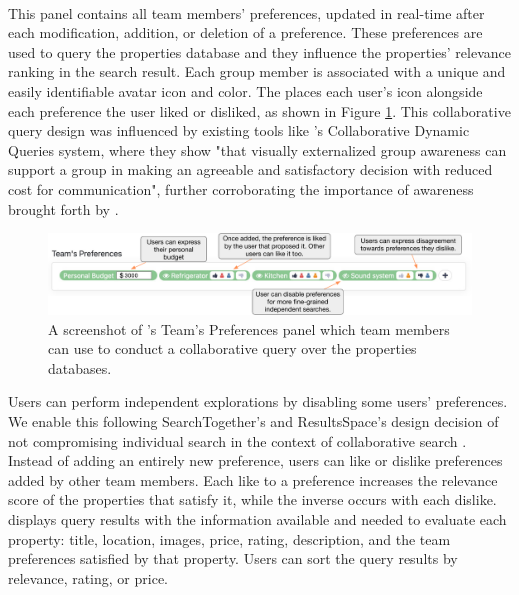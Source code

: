 \paragraph{\collabQueryPanel} This panel contains all team members' preferences, updated in real-time after each modification, addition, or deletion of a preference. These preferences are used to query the properties database and they influence the properties' relevance ranking in the search result. Each group member is associated with a unique and easily identifiable avatar icon and color. The \collabQueryPanel places each user's icon alongside each preference the user liked or disliked, as shown in Figure \ref{fig:ui_teams_preferences}. This collaborative query design was influenced by existing tools like \citeauthor{c-dq}'s Collaborative Dynamic Queries system, where they show "that visually externalized group awareness can support a
group in making an agreeable and satisfactory decision with
reduced cost for communication", further corroborating the importance of awareness brought forth by \citeauthor{searchtogether} \cite{c-dq,searchtogether, cometogether}.
\begin{figure}
    \centering
    \includegraphics[width=1\textwidth]{images/ui-team-preferences.pdf}
    \caption{A screenshot of \tool's Team's Preferences panel which team members can use to conduct a collaborative query over the properties databases.}
    \label{fig:ui_teams_preferences}
\end{figure}

Users can perform independent explorations by disabling some users' preferences. We enable this following SearchTogether's and ResultsSpace's design decision of not compromising individual search in the context of collaborative search \cite{searchtogether, resultsspace}. Instead of adding an entirely new preference, users can like or dislike preferences added by other team members. Each like to a preference increases the relevance score of the properties that satisfy it, while the inverse occurs with each dislike. \tool displays query results with the information available and needed to evaluate each property: title, location, images, price, rating, description, and the team preferences satisfied by that property. Users can sort the query results by relevance, rating, or price.

